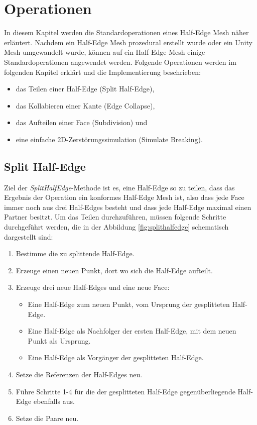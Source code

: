 \section{Operationen}
In diesem Kapitel werden die Standardoperationen eines Half-Edge Mesh n\"aher erl\"autert. Nachdem ein Half-Edge Mesh prozedural erstellt wurde oder ein Unity Mesh umgewandelt wurde, k\"onnen auf ein Half-Edge Mesh einige Standardoperationen angewendet werden. Folgende Operationen werden im folgenden Kapitel erkl\"art und die Implementierung beschrieben:
\begin{itemize}
	\item das Teilen einer Half-Edge (Split Half-Edge),
	\item das Kollabieren einer Kante (Edge Collapse),
	\item das Aufteilen einer Face (Subdivision) und
	\item eine einfache 2D-Zerst\"orungssimulation (Simulate Breaking).
\end{itemize}

\subsection{Split Half-Edge}
Ziel der \textit{SplitHalfEdge}-Methode ist es, eine Half-Edge so zu teilen, dass das Ergebnis der Operation ein konformes Half-Edge Mesh ist, also dass jede Face immer noch aus drei Half-Edges besteht und dass jede Half-Edge maximal einen Partner besitzt. Um das Teilen durchzuf\"uhren, m\"ussen folgende Schritte durchgef\"uhrt werden, die in der Abbildung \ref{fig:splithalfedge} schematisch dargestellt sind:
\begin{enumerate}
	\item Bestimme die zu splittende Half-Edge.
	\item Erzeuge einen neuen Punkt, dort wo sich die Half-Edge aufteilt.
	\item Erzeuge drei neue Half-Edges und eine neue Face:
	\begin{itemize}
		\item Eine Half-Edge zum neuen Punkt, vom Ursprung der gesplitteten Half-Edge.
		\item Eine Half-Edge als Nachfolger der ersten Half-Edge, mit dem neuen Punkt als Ursprung.
		\item Eine Half-Edge als Vorg\"anger der gesplitteten Half-Edge.
	\end{itemize}
	\item Setze die Referenzen der Half-Edges neu.
	\item F\"uhre Schritte 1-4 f\"ur die der gesplitteten Half-Edge gegen\"uberliegende Half-Edge ebenfalls aus.
	\item Setze die Paare neu.
\end{enumerate}

